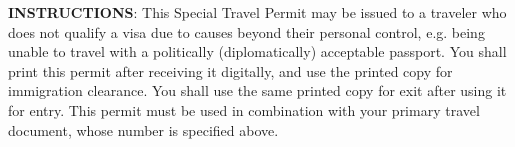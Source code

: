 





\vskip 20pt
\small
\textbf{INSTRUCTIONS}:
\inlinelistitem This Special Travel Permit may be issued to a traveler who does not qualify a visa due to causes beyond their personal control, e.g. being unable to travel with a politically (diplomatically) acceptable passport.
\inlinelistitem You shall print this permit after receiving it digitally, and use the printed copy for immigration clearance.
\inlinelistitem You shall use the same printed copy for exit after using it for entry.
\inlinelistitem This permit must be used in combination with your primary travel document, whose number is specified above.



